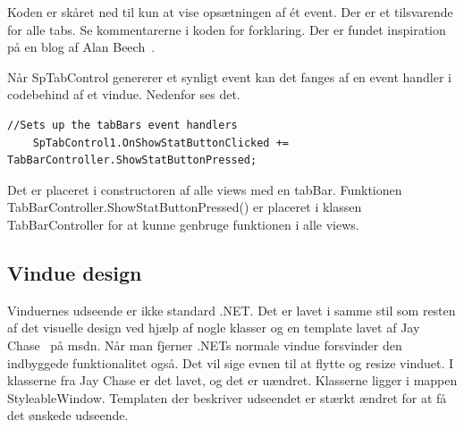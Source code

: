 Koden er skåret ned til kun at vise opsætningen af ét event. Der er et tilsvarende for alle tabs. Se kommentarerne i koden for forklaring.
Der er fundet inspiration på en blog af Alan Beech~\cite{alanbeech2011}.

Når SpTabControl genererer et synligt event kan det fanges af en event handler i codebehind af et vindue. Nedenfor ses det.
\begin{lstlisting}[caption=EventHandler setup, label=EventHandlerSetup]
	//Sets up the tabBars event handlers
	SpTabControl1.OnShowStatButtonClicked += TabBarController.ShowStatButtonPressed;
\end{lstlisting}
Det er placeret i constructoren af alle views med en tabBar.
Funktionen TabBarController.ShowStatButtonPressed() er placeret i klassen TabBarController for at kunne genbruge funktionen i alle views.

\subsection{Vindue design}
Vinduernes udseende er ikke standard .NET. Det er lavet i samme stil som resten af det visuelle design ved hjælp af nogle klasser og en template lavet af Jay Chase~\cite{websiteCustomWindow} på msdn.
Når man fjerner .NETs normale vindue forsvinder den indbyggede funktionalitet også. Det vil sige evnen til at flytte og resize vinduet. I klasserne fra Jay Chase er det lavet, og det er uændret. Klasserne ligger i mappen StyleableWindow. Templaten der beskriver udseendet er stærkt ændret for at få det ønskede udseende.